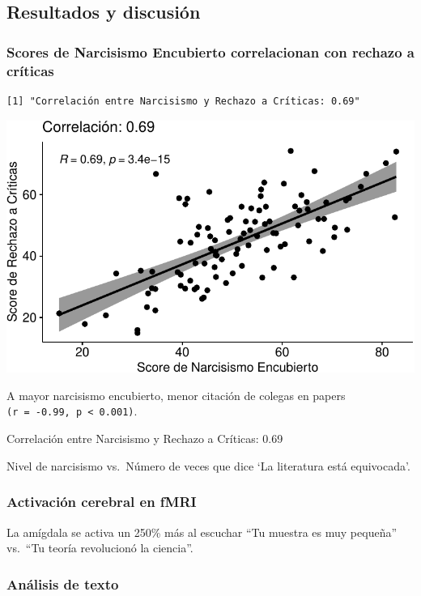 \documentclass[
]{article}
\begin{document}
\subsection{Resultados y discusión}\label{resultados-y-discusiuxf3n}

\subsubsection{Scores de Narcisismo Encubierto correlacionan con rechazo
a
críticas}\label{scores-de-narcisismo-encubierto-correlacionan-con-rechazo-a-cruxedticas}

\begin{verbatim}
[1] "Correlación entre Narcisismo y Rechazo a Críticas: 0.69"
\end{verbatim}

\includegraphics{template_files/figure-pdf/unnamed-chunk-2-1.pdf}

A mayor narcisismo encubierto, menor citación de colegas en papers
\texttt{(r\ =\ -0.99,\ p\ \textless{}\ 0.001)}.

Correlación entre Narcisismo y Rechazo a Críticas: 0.69

Nivel de narcisismo vs.~Número de veces que dice `La literatura está
equivocada'.

\subsubsection{Activación cerebral en
fMRI}\label{activaciuxf3n-cerebral-en-fmri}

La amígdala se activa un 250\% más al escuchar ``Tu muestra es muy
pequeña'' vs.~``Tu teoría revolucionó la ciencia''.

\subsubsection{Análisis de texto}\label{anuxe1lisis-de-texto}
\end{document}
